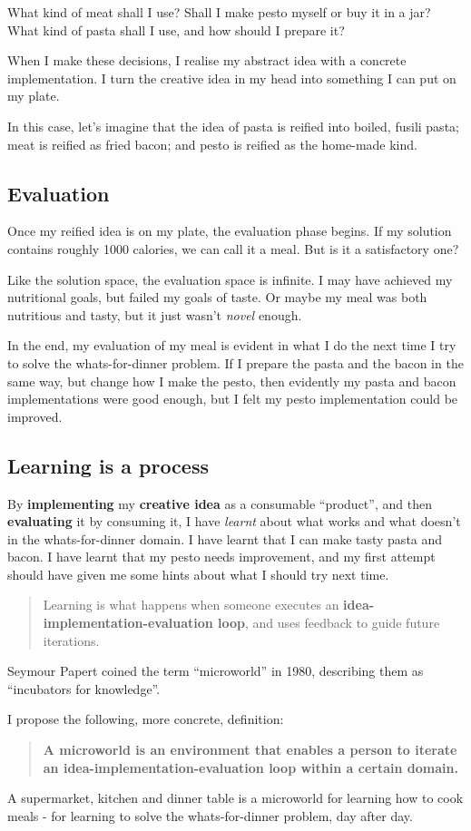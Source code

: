 What kind of meat shall I use? Shall I make pesto myself or buy it in a jar?
What kind of pasta shall I use, and how should I prepare it?

When I make these decisions, I realise my abstract idea
with a concrete implementation. I turn the creative idea in my head
into something I can put on my plate. 

In this case, let's imagine that the idea of pasta is reified into boiled, fusili pasta; meat is reified as fried bacon; and pesto is reified as the home-made kind. 

\subsection{Evaluation}

Once my reified idea is on my plate, the evaluation phase begins. If my
solution contains roughly 1000 calories, we can call it a meal. But is
it a satisfactory one?

Like the solution space, the evaluation space is infinite. I may have
achieved my nutritional goals, but failed my goals of taste. Or maybe my
meal was both nutritious and tasty, but it just wasn't \emph{novel}
enough.

In the end, my evaluation of my meal is evident in what I do the next time I try to solve the whats-for-dinner problem. If I prepare the pasta and the bacon in the same way, but change how I make the pesto, then evidently my pasta and bacon implementations were good enough, but I felt my pesto implementation could be improved. 

\subsection{Learning is a process}

By \textbf{implementing} my \textbf{creative idea} as a consumable ``product'', and then \textbf{evaluating} it by consuming it, I have \textit{learnt} about what works and what doesn't in the whats-for-dinner domain. I have learnt that I can make tasty pasta and bacon. I have learnt that my pesto needs improvement, and my first attempt should have given me some hints about what I should try next time. 

\begin{quote}
  Learning is what happens when someone executes an
  \textbf{idea-implementation-evaluation loop}, and uses feedback to guide future
  iterations.
\end{quote}

Seymour Papert coined the term ``microworld'' in 1980, describing them as ``incubators for knowledge''\cite[p120]{mindstorms}.

I propose the following, more concrete, definition:

\begin{quote}
  \textbf{A microworld is an environment that enables a person to iterate
  an idea-implementation-evaluation loop within a certain domain.}
\end{quote}

A supermarket, kitchen and dinner table is a microworld for learning how to cook meals - for learning to solve the whats-for-dinner problem, day after day.
